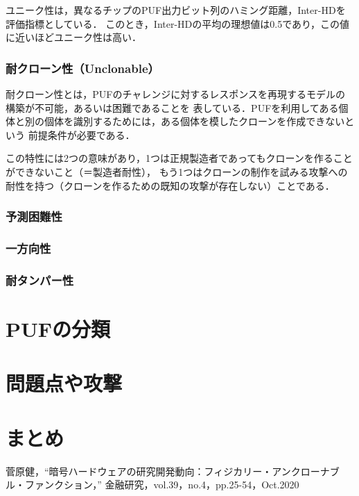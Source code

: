 \documentclass[survey]{ieicej}%
\begin{document}
ユニーク性は，異なるチップのPUF出力ビット列のハミング距離，Inter-HDを評価指標としている．
このとき，Inter-HDの平均の理想値は0.5であり，この値に近いほどユニーク性は高い．
\subsubsection{耐クローン性（Unclonable）}
耐クローン性とは，PUFのチャレンジに対するレスポンスを再現するモデルの構築が不可能，あるいは困難であることを
表している．PUFを利用してある個体と別の個体を識別するためには，ある個体を模したクローンを作成できないという
前提条件が必要である．

この特性には2つの意味があり，1つは正規製造者であってもクローンを作ることができないこと（＝製造者耐性），
もう1つはクローンの制作を試みる攻撃への耐性を持つ（クローンを作るための既知の攻撃が存在しない）ことである．


\subsubsection{予測困難性}
\subsubsection{一方向性}
\subsubsection{耐タンパー性}

\section{PUFの分類}
\section{問題点や攻撃}
\section{まとめ}


%
%
\begin{thebibliography}{99}%
  菅原健，“暗号ハードウェアの研究開発動向：フィジカリー・アンクローナブル・ファンクション，”
  金融研究，vol.39，no.4，pp.25-54，Oct.2020

\end{thebibliography}


\end{document}
